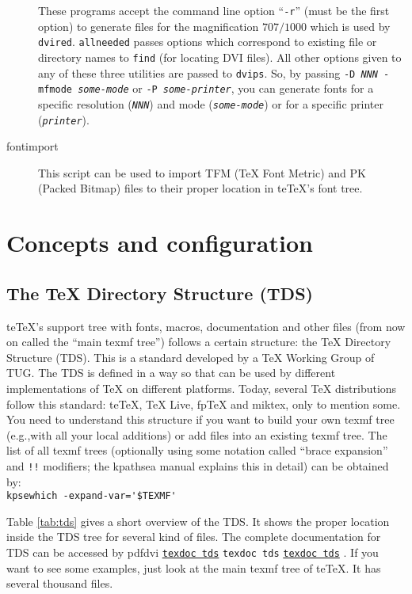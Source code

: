 \documentclass[11pt,a4paper]{article}
\newcommand{\pdfext}{pdf}
\newcommand{\dviext}{dvi}
\newcommand{\dlink}[3]{%
  \ifpdf
    \ifx\pdfext#3
      \href{#1/#2.#3}{\texttt{texdoc #2}}%
    \else
      \texttt{texdoc #2}%
    \fi
  \else
     \href{#1/#2.#3}{\mbox{\texttt{texdoc #2}}}%
  \fi}
\newcommand{\teTeX}{\textrm{te}\TeX\xspace}
\begin{document}
\begin{description}
  These programs accept the command line option ``\texttt{-r}'' (must
  be the first option) to generate files for the magnification $707 /
  1000$ which is used by \texttt{dvired}. \texttt{allneeded} passes
  options which correspond to existing file or directory names to
  \texttt{find} (for locating DVI files). All other options given to
  any of these three utilities are passed to \texttt{dvips}. So, by
  passing \texttt{-D \textit{NNN} -mfmode \textit{some-mode}} or
  \texttt{-P \textit{some-printer}}, you can generate fonts for a
  specific resolution (\texttt{\textit{NNN}}) and mode
  (\texttt{\textit{some-mode}}) or for a specific printer
  (\texttt{\textit{printer}}).
\item[fontimport] This script can be used to import TFM (\TeX{} Font
  Metric) and PK (Packed Bitmap) files to their proper location in
  \teTeX's font tree.
\end{description}


\section{Concepts and configuration}

\subsection{The \TeX{} Directory Structure (TDS)}
\teTeX{}'s support tree with fonts, macros, documentation and other
files (from now on called the ``main texmf tree'') follows a certain
structure: the \TeX{} Directory Structure (TDS). This is a standard
developed by a \TeX{} Working Group of TUG. The TDS is defined in a
way so that can be used by different implementations of \TeX{} on
different platforms.  Today, several \TeX{} distributions follow this
standard: \teTeX, \TeX{} Live, fp\TeX{} and miktex, only to mention
some.  You need to understand this structure if you want to build your
own texmf tree (e.g.,\@ with all your local additions) or add files
into an existing texmf tree.  The list of all texmf trees (optionally
using some notation called ``brace expansion'' and \verb+!!+
modifiers; the kpathsea manual
explains this in detail) can be obtained by:\\
\null\qquad\verb+kpsewhich -expand-var='$TEXMF'+


\def\replaceable#1{{\rmfamily $\langle$\textit{#1}$\rangle$}} Table
\ref{tab:tds} gives a short overview of the TDS. It shows the proper
location inside the TDS tree for several kind of files. The complete
documentation for TDS can be accessed by
\dlink{../help}{tds}{\dviext}. If you want to see some examples, just
look at the main texmf tree of \teTeX. It has several thousand
files.\bigskip
\end{document}
